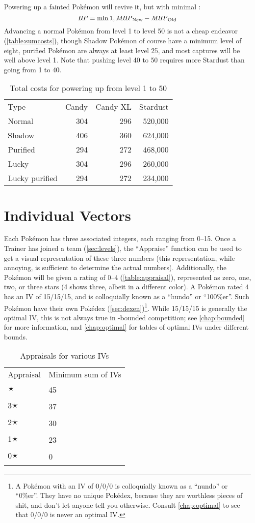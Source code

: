 Powering up a fainted Pokémon will revive it, but with minimal \HP\@:
\[ \mbox{$\mathit{HP}$} = \min{1, \mbox{$\mathit{MHP}$}_\mathrm{New} - \mbox{$\mathit{MHP}$}_\mathrm{Old} } \]
Advancing a normal Pokémon from level 1 to level 50 is not a cheap endeavor (\autoref{table:sumcosts}),
  though Shadow Pokémon of course have a minimum level of eight, purified Pokémon are always
  at least level 25, and most captures will be well above level 1.
Note that pushing level 40 to 50 requires more Stardust than going from 1 to 40.
\begin{table}[ht]
\centering
\begin{tabular}{lrrr}
  Type & Candy & Candy XL & Stardust\\
\Midrule
        Normal & 304 & 296 & 520,000\\
        Shadow & 406 & 360 & 624,000\\
      Purified & 294 & 272 & 468,000\\
         Lucky & 304 & 296 & 260,000\\
Lucky purified & 294 & 272 & 234,000\\
\end{tabular}
\caption{Total costs for powering up from level 1 to 50\label{table:sumcosts}}
\end{table}

\section{Individual Vectors\label{sec:ivs}}
Each Pokémon has three associated integers, each ranging from 0--15.
Once a Trainer has joined a team (\autoref{sec:levels}), the ``Appraise'' function can be used to
  get a visual representation of these three numbers (this representation,
  while annoying, is sufficient to determine the actual numbers).
Additionally, the Pokémon will be given a rating of 0--4 (\autoref{table:appraisal}), represented as
  zero, one, two, or three stars (4 shows three, albeit in a different color).
A Pokémon rated 4 has an IV of 15/15/15, and is colloquially known as a ``hundo'' or ``100\%er''.
Such Pokémon have their own Pokédex (\autoref{sec:dexen})\footnote{A Pokémon with an IV of 0/0/0
 is colloquially known as a ``nundo'' or ``0\%er''. They have no unique Pokédex, because they are worthless pieces of shit,
  and don't let anyone tell you otherwise. Consult \autoref{chap:optimal} to see that 0/0/0 is never an optimal IV.}.
While 15/15/15 is generally the optimal IV, this is not always true in \CP-bounded
  competition; see \autoref{chap:bounded} for more information,
  and \autoref{chap:optimal} for tables of optimal IVs under different \CP{} bounds.
\begin{table}
\centering
\begin{tabular}{ll}
Appraisal & Minimum sum of IVs\\
\Midrule
4🟉 & 45\\
3🟉 & 37\\
2🟉 & 30\\
1🟉 & 23\\
0🟉 & 0\\
\end{tabular}
\caption{Appraisals for various IVs\label{table:appraisal}}
\end{table}

